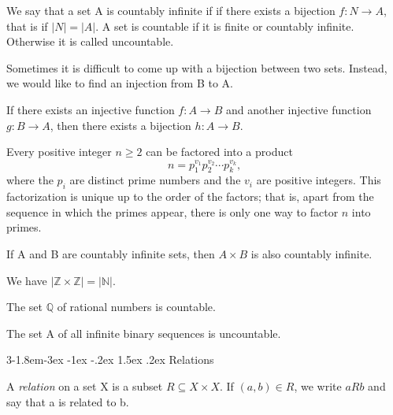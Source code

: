 \documentclass{tufte-handout}
\makeatletter
\renewcommand{\subsection}{\@startsection{subsection}%
    {3}{-1.8em}{-3ex \@plus -1ex \@minus -.2ex}%
    {1.5ex \@plus .2ex}
    {\hspace*{-5.5em}\fcolorbox{ltblue}{ltblue}{\parbox[c][1.0ex][b]{4em}{\phantom{space}}}
    \normalfont\large\itshape\color{ltblue}}}
\makeatother
\begin{document}
We say that a set A is countably infinite if if there exists a bijection \( f:N\to A \), that is
if \( \left|N\right| = \left|A\right| \). A set is countable if it is finite or countably infinite.
Otherwise it is called uncountable.

Sometimes it is difficult to come up with a bijection between two sets. Instead,
we would like to find an injection from B to A.

\begin{Theorem}
    If there exists an injective function \( f:A\to B \) and another injective function \( g:B\to A \),
    then there exists a bijection \( h:A\to B \).
\end{Theorem}

\begin{Theorem}
Every positive integer \( n \geq 2 \) can be factored into a product
\[
n = p_1^{v_1} p_2^{v_2} \cdots p_k^{v_k},
\]
where the \( p_i \) are distinct prime numbers and the \( v_i \) are positive integers.
 This factorization is unique up to the order of the factors; 
 that is, apart from the sequence in which the primes appear, there is
  only one way to factor \( n \) into primes.
\end{Theorem}
    
\begin{Theorem}
    If A and B are countably infinite sets, then \( A \times B\) is also
    countably infinite.
\end{Theorem}

\begin{Corollary}
    We have \( \left| \mathbb{Z} \times \mathbb{Z} \right| = \left| \mathbb{N} \right| \).
\end{Corollary}

\begin{Theorem}
    The set \( \mathbb{Q} \) of rational numbers is countable.
\end{Theorem}

\begin{Theorem}
    The set A of all infinite binary sequences is uncountable.
\end{Theorem}

\subsection{Relations}
\begin{Definition}
A \textit{relation} on a set X is a subset \( R \subseteq X \times X \).
If \( (a,b) \in R \), we write \( aRb \) and say that a is related to b.
\end{Definition}
\end{document}
